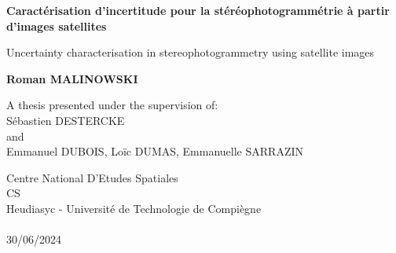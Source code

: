 \begin{titlepage}
    \begin{center}
        \vspace*{1cm}
            
        \Huge
        \textbf{Caractérisation d'incertitude pour la stéréophotogrammétrie à partir d'images satellites}
            
        \vspace{0.5cm}
        \LARGE
        Uncertainty characterisation in stereophotogrammetry using satellite images

        \vspace{1.5cm}
        \Large
        \textbf{Roman MALINOWSKI}
        \vspace{0.8cm}
            
        A thesis presented under the supervision of:\\
        Sébastien DESTERCKE\\
        and\\
        Emmanuel DUBOIS, Loïc DUMAS, Emmanuelle SARRAZIN
       
        \vfill
                
        \large
        Centre National D'Etudes Spatiales\\
        CS\\
        Heudiasyc - Université de Technologie de Compiègne\\
        ~\\
        30/06/2024


\end{center}
\end{titlepage}
